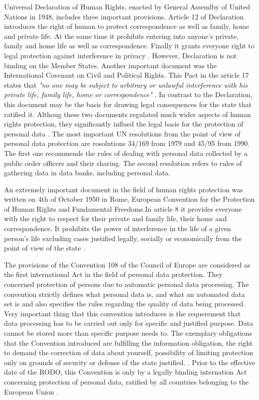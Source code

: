 \documentclass[en, noamssymb]{mgr}
\begin{document}
\indent Universal Declaration of Human Rights, enacted by General Assemlby of United Nations in 1948, includes three important provisions. Article 12 of Declaration introduces the right of human to protect correspondence as well as family, home and private life. At the same time it prohibits entering into anyone's private, family and home life as well as correspondence. Finally it grants everyone right to legal protection against interference in privacy \cite{prawo_odo}. However, Declaration is not binding on the Member States. Another important document was the International Covenant on Civil and Political Rights. This Pact in the article 17 states that \textit{"no one may be subject to arbitrary or unlawful interference with his private life, family life, home or correspondence"} \cite{prawo_odo}. In contrast to the Declaration, this document may be the basis for drawing legal consequences for the state that ratified it. Althoug these two documents regulated much wider aspects of human rights protection, they significantly influed the legal basis for the protection of personal data \cite{prawo_odo}. The most important UN resolutions from the point of view of personal data protection are rosolutions 34/169 from 1979 and 45/95 from 1990. The first one recommends the rules of dealing with personal data collected by a public order officers and their sharing. The second resolution refers to rules of gathering data in data banks, including personal data.

\indent An extremely important document in the field of human rights protection was written on 4th of October 1950 in Rome, European Convention for the Protection of Human Rights and Fundamental Freedoms.In article 8 it provides everyone with the right to respect for their private and family life, their home and correspondence. It prohibits the power of interference in the life of a given person's life excluding cases justified legally, socially or economically from the point of view of the state \cite{prawo_odo}.

\indent The provisions of the Convention 108 of the Council of Europe are considered as the first international Act in the field of personal data protection. They concerned protection of persons due to automatic personal data processing. The convention strictly defines what personal data is, and what an automated data set is and also specifies the rules regarding the quality of data being processed. Very important thing that this convention introduces is the requerement that data processing has to be carried out only for specific and justified purpose. Data cannot be stored more than specific purpose needs to. The exemplary obligations that the Convention introduced are fulfilling the information obligation, the right to demand the correction of data about yourself, possibility of limiting protection only on grounds of security or defense of the state justified. \cite{prawo_odo}. Prior to the effective date of the RODO, this Convention is only by a legally binding internation Act concerning protection of personal data, ratified by all countries belonging to the European Union \cite{prawo_odo}.
\end{document}
